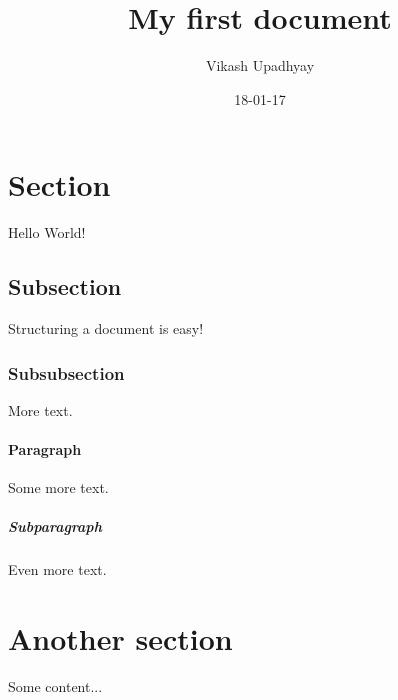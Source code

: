 \documentclass{article}
\title{My first document}
\date{18-01-17}
\author{Vikash Upadhyay}
\begin{document}
\maketitle

\newpage
{}

\section{Section}
 Hello World!

\subsection{Subsection}
 Structuring a document is easy!

\subsubsection{Subsubsection}
 More text.

\paragraph{Paragraph}
 Some more text.

\subparagraph{Subparagraph}
 Even more text.

\section {Another section}

\newpage

 Some content...
\end{document}
